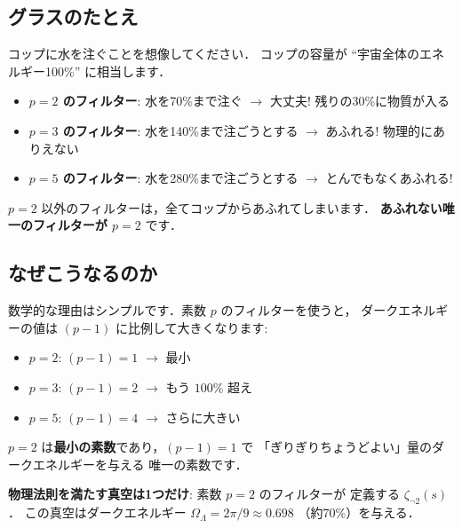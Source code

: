 \documentclass[11pt,a4paper]{article}
\begin{document}
\subsection{グラスのたとえ}

\begin{tcolorbox}[colback=cyan!5,colframe=cyan!50!black,title=グラスのたとえ]
コップに水を注ぐことを想像してください．
コップの容量が ``宇宙全体のエネルギー100\%'' に相当します．

\begin{itemize}
\item \textbf{$p=2$ のフィルター}: 水を70\%まで注ぐ
$\to$ 大丈夫! 残りの30\%に物質が入る
\item \textbf{$p=3$ のフィルター}: 水を140\%まで注ごうとする
$\to$ あふれる! 物理的にありえない
\item \textbf{$p=5$ のフィルター}: 水を280\%まで注ごうとする
$\to$ とんでもなくあふれる!
\end{itemize}

$p=2$ 以外のフィルターは，全てコップからあふれてしまいます．
\textbf{あふれない唯一のフィルターが $p=2$} です．
\end{tcolorbox}

\subsection{なぜこうなるのか}

数学的な理由はシンプルです．素数 $p$ のフィルターを使うと，
ダークエネルギーの値は $(p-1)$ に比例して大きくなります:

\begin{itemize}
\item $p=2$: $(p-1) = 1$ $\to$ 最小
\item $p=3$: $(p-1) = 2$ $\to$ もう $100\%$ 超え
\item $p=5$: $(p-1) = 4$ $\to$ さらに大きい
\end{itemize}

$p=2$ は\textbf{最小の素数}であり，$(p-1) = 1$ で
「ぎりぎりちょうどよい」量のダークエネルギーを与える
唯一の素数です．

\begin{tcolorbox}[colback=green!5,colframe=green!50!black,title=結論]
\textbf{物理法則を満たす真空は1つだけ}: 素数 $p=2$ のフィルターが
定義する $\zeta_{\neg 2}(s)$．
この真空はダークエネルギー $\Omega_\Lambda = 2\pi/9 \approx 0.698$
（約70\%）を与える．
\end{tcolorbox}

\end{document}
